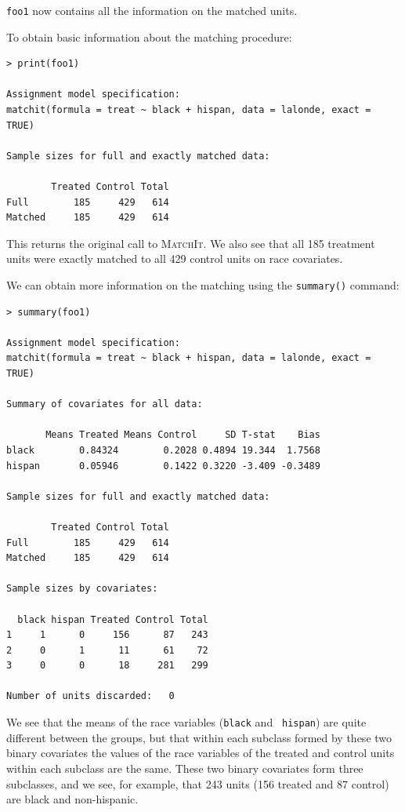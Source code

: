 \documentclass[oneside,letterpaper,titlepage]{article}
\newcommand{\MatchIt}{\textsc{MatchIt}}
\begin{document}
\texttt{foo1} now contains all the information on the matched units.  

To obtain basic information about the matching procedure: 

\begin{verbatim}
> print(foo1)
 
Assignment model specification:
matchit(formula = treat ~ black + hispan, data = lalonde, exact = TRUE)
 
Sample sizes for full and exactly matched data:
 
        Treated Control Total
Full        185     429   614
Matched     185     429   614
\end{verbatim} 
 
This returns the original call to \MatchIt.  We also see that all 185
treatment units were exactly matched to all 429 control units on race
covariates.  

We can obtain more information on the matching using the {\tt summary()} command:

\begin{verbatim}
> summary(foo1)
 
Assignment model specification:
matchit(formula = treat ~ black + hispan, data = lalonde, exact = TRUE)
 
Summary of covariates for all data:
 
       Means Treated Means Control     SD T-stat    Bias
black        0.84324        0.2028 0.4894 19.344  1.7568
hispan       0.05946        0.1422 0.3220 -3.409 -0.3489
  
Sample sizes for full and exactly matched data:
 
        Treated Control Total
Full        185     429   614
Matched     185     429   614
 
Sample sizes by covariates:
 
  black hispan Treated Control Total
1     1      0     156      87   243
2     0      1      11      61    72
3     0      0      18     281   299
 
Number of units discarded:   0
\end{verbatim}

We see that the means of the race variables ({\tt black} and {\tt
  hispan}) are quite different between the groups, but that within
each subclass formed by these two binary covariates the values of the
race variables of the treated and control units within each subclass
are the same.  These two binary covariates form three subclasses, and
we see, for example, that 243 units (156 treated and 87 control) are
black and non-hispanic.
\end{document}
